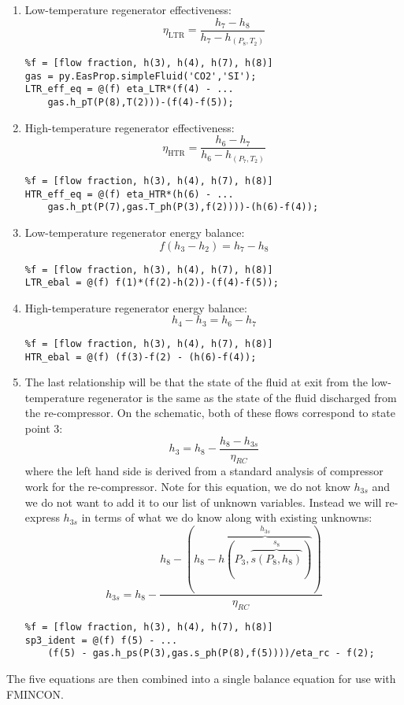\begin{enumerate}
\item Low-temperature regenerator effectiveness:
$$\eta_{\text{LTR}} = \frac{h_7 - h_8}{h_7-h_{(P_8,T_2)}}$$
\begin{lstlisting}
%f = [flow fraction, h(3), h(4), h(7), h(8)]
gas = py.EasProp.simpleFluid('CO2','SI');
LTR_eff_eq = @(f) eta_LTR*(f(4) - ...
    gas.h_pT(P(8),T(2)))-(f(4)-f(5));
\end{lstlisting}

\item High-temperature regenerator effectiveness:
$$\eta_{\text{HTR}} = \frac{h_6 - h_7}{h_6 - h_{(P_7,T_2)}}$$
\begin{lstlisting}
%f = [flow fraction, h(3), h(4), h(7), h(8)]
HTR_eff_eq = @(f) eta_HTR*(h(6) - ...
    gas.h_pt(P(7),gas.T_ph(P(3),f(2))))-(h(6)-f(4));
\end{lstlisting}

\item Low-temperature regenerator energy balance:
$$f(h_3 - h_2) = h_7 - h_8$$
\begin{lstlisting}
%f = [flow fraction, h(3), h(4), h(7), h(8)]
LTR_ebal = @(f) f(1)*(f(2)-h(2))-(f(4)-f(5));
\end{lstlisting}

\item High-temperature regenerator energy balance:
$$h_4 - h_3 = h_6 - h_7$$

\begin{lstlisting}
%f = [flow fraction, h(3), h(4), h(7), h(8)]
HTR_ebal = @(f) (f(3)-f(2) - (h(6)-f(4));
\end{lstlisting}
\item The last relationship will be that the state of the fluid at exit from the low-temperature regenerator is the same as the state of the fluid discharged from the re-compressor.  On the schematic, both of these flows correspond to state point 3:
$$h_3 = h_8 - \frac{h_8 - h_{3s}}{\eta_{RC}}$$
where the left hand side is derived from a standard analysis of compressor work for the re-compressor.  Note for this equation, we do not know $h_{3s}$ and we do not want to add it to our list of unknown variables.  Instead we will re-express $h_{3s}$ in terms of what we do know along with existing unknowns:
$$h_{3s} = h_8 - \frac{h_8 - (h_8 - \overbrace{h(P_3,\overbrace{s(P_8,h_8)}^{s_8})}^{h_{3s}})}{\eta_{RC}}$$

\begin{lstlisting}
%f = [flow fraction, h(3), h(4), h(7), h(8)]
sp3_ident = @(f) f(5) - ...
    (f(5) - gas.h_ps(P(3),gas.s_ph(P(8),f(5))))/eta_rc - f(2);
\end{lstlisting}


\end{enumerate}
The five equations are then combined into a single balance equation for use with FMINCON.

